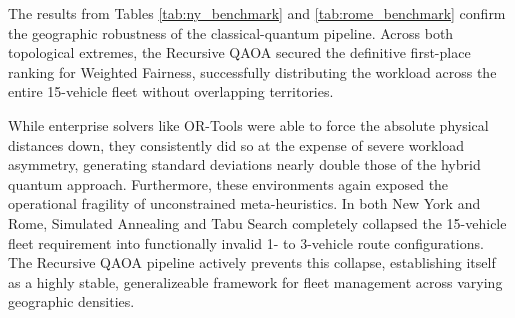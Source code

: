 \documentclass[a4paper]{report}
\begin{document}
{\begin{itemize}
\begin{itemize}
\begin{table}[htpb]
\centering
\caption{Algorithm Performance for the Historic Urban Benchmark (Rome Topology)}
\label{tab:rome_benchmark}
\end{table}

The results from Tables \ref{tab:ny_benchmark} and \ref{tab:rome_benchmark} confirm the geographic robustness of the classical-quantum pipeline. Across both topological extremes, the Recursive QAOA secured the definitive first-place ranking for Weighted Fairness, successfully distributing the workload across the entire 15-vehicle fleet without overlapping territories.

While enterprise solvers like OR-Tools were able to force the absolute physical distances down, they consistently did so at the expense of severe workload asymmetry, generating standard deviations nearly double those of the hybrid quantum approach. Furthermore, these environments again exposed the operational fragility of unconstrained meta-heuristics. In both New York and Rome, Simulated Annealing and Tabu Search completely collapsed the 15-vehicle fleet requirement into functionally invalid 1- to 3-vehicle route configurations. The Recursive QAOA pipeline actively prevents this collapse, establishing itself as a highly stable, generalizeable framework for fleet management across varying geographic densities.


\end{itemize}
\end{itemize}}
\end{document}
